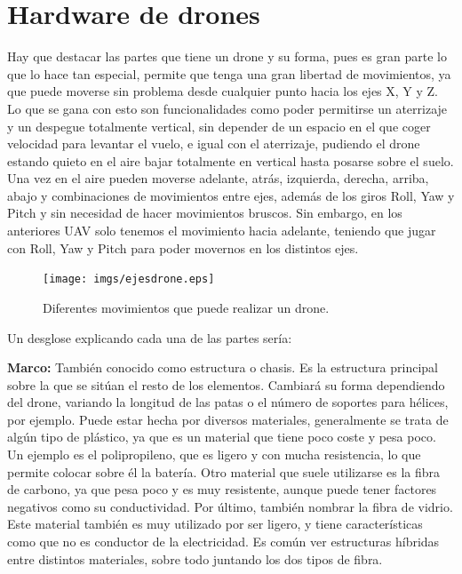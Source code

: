 \section{Hardware de drones}
\hspace{1 cm} Hay que destacar las partes que tiene un drone y su forma, pues es gran parte lo que lo hace tan especial, permite que tenga una gran libertad de movimientos, ya que puede moverse sin problema desde cualquier punto hacia los ejes X, Y y Z. Lo que se gana con esto son funcionalidades como poder permitirse un aterrizaje y un despegue totalmente vertical, sin depender de un espacio en el que coger velocidad para levantar el vuelo, e igual con el aterrizaje, pudiendo el drone estando quieto en el aire bajar totalmente en vertical hasta posarse sobre el suelo. Una vez en el aire pueden moverse adelante, atr\'as, izquierda, derecha, arriba, abajo y combinaciones de movimientos entre ejes, adem\'as de los giros Roll, Yaw y Pitch y sin necesidad de hacer movimientos bruscos. Sin embargo, en los anteriores UAV solo tenemos el movimiento hacia adelante, teniendo que jugar con Roll, Yaw y Pitch para poder movernos en los distintos ejes.

\begin{figure}[ht]
	\centering
		\texttt{[image: imgs/ejesdrone.eps]}
		\caption{Diferentes movimientos que puede realizar un drone.}
	\label{fig:ejesdrone}
\end{figure}

\hspace{1 cm} Un desglose explicando cada una de las partes ser\'ia:

\hspace{1 cm}\textbf{Marco:} Tambi\'en conocido como estructura o chasis. Es la estructura principal sobre la que se sit\'uan el resto de los elementos. Cambiar\'a su forma dependiendo del drone, variando la longitud de las patas o el n\'umero de soportes para h\'elices, por ejemplo. Puede estar hecha por diversos materiales, generalmente se trata de alg\'un tipo de pl\'astico, ya que es un material que tiene poco coste y pesa poco. Un ejemplo es el polipropileno, que es ligero y con mucha resistencia, lo que permite colocar sobre \'el la bater\'ia. Otro material que suele utilizarse es la fibra de carbono, ya que pesa poco y es muy resistente, aunque puede tener factores negativos como su conductividad. Por \'ultimo, tambi\'en nombrar la fibra de vidrio. Este material tambi\'en es muy utilizado por ser ligero, y tiene caracter\'isticas como que no es conductor de la electricidad. Es com\'un ver estructuras h\'ibridas entre distintos materiales, sobre todo juntando los dos tipos de fibra. 

